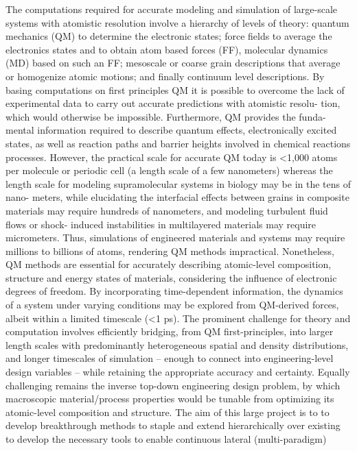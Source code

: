 \documentclass[10pt]{article}
\begin{document}
The computations required for accurate modeling and simulation of large-scale
systems with atomistic resolution involve a hierarchy of levels of theory: quantum
mechanics (QM) to determine the electronic states; force fields to average the
electronics states and to obtain atom based forces (FF), molecular dynamics (MD)
based on such an FF; mesoscale or coarse grain descriptions that average or
homogenize atomic motions; and finally continuum level descriptions.
By basing computations on first principles QM it is possible to overcome the
lack of experimental data to carry out accurate predictions with atomistic resolu-
tion, which would otherwise be impossible. Furthermore, QM provides the funda-
mental information required to describe quantum effects, electronically excited
states, as well as reaction paths and barrier heights involved in chemical reactions
processes. However, the practical scale for accurate QM today is <1,000 atoms per
molecule or periodic cell (a length scale of a few nanometers) whereas the length
scale for modeling supramolecular systems in biology may be in the tens of nano-
meters, while elucidating the interfacial effects between grains in composite materials
may require hundreds of nanometers, and modeling turbulent fluid flows or shock-
induced instabilities in multilayered materials may require micrometers. Thus,
simulations of engineered materials and systems may require millions to billions
of atoms, rendering QM methods impractical.
Nonetheless, QM methods are essential for accurately describing atomic-level
composition, structure and energy states of materials, considering the influence of
electronic degrees of freedom. By incorporating time-dependent information, the
dynamics of a system under varying conditions may be explored from QM-derived
forces, albeit within a limited timescale (<1 ps). The prominent challenge for theory
and computation involves efficiently bridging, from QM first-principles, into larger
length scales with predominantly heterogeneous spatial and density distributions,
and longer timescales of simulation – enough to connect into engineering-level
design variables – while retaining the appropriate accuracy and certainty. Equally
challenging remains the inverse top-down engineering design problem, by which
macroscopic material/process properties would be tunable from optimizing its
atomic-level composition and structure. The aim of this large project is to 
to develop breakthrough methods to staple and extend hierarchically over existing
to develop the necessary tools to enable continuous lateral (multi-paradigm) 
\end{document}
